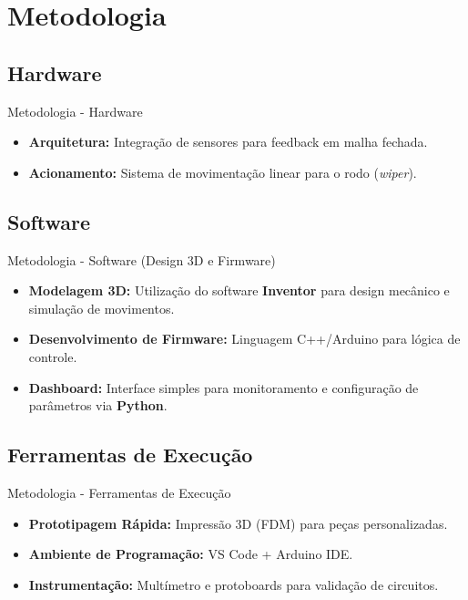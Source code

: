 \documentclass[aspectratio=169, xcolor={table}]{beamer}
\begin{document}
\section{Metodologia}
\subsection{Hardware}
\begin{frame}{Metodologia - Hardware}
    \begin{itemize}
        \item \textbf{Arquitetura:} Integração de sensores para feedback em malha fechada.
        \item \textbf{Acionamento:} Sistema de movimentação linear para o rodo (\textit{wiper}).
    \end{itemize}
\end{frame}

\subsection{Software}
\begin{frame}{Metodologia - Software (Design 3D e Firmware)}
    \begin{itemize}
        \item \textbf{Modelagem 3D:} Utilização do software \textbf{Inventor} para design mecânico e simulação de movimentos.
        \item \textbf{Desenvolvimento de Firmware:} Linguagem C++/Arduino para lógica de controle.
        \item \textbf{Dashboard:} Interface simples para monitoramento e configuração de parâmetros via \textbf{Python}.
    \end{itemize}
\end{frame}

\subsection{Ferramentas de Execução}
\begin{frame}{Metodologia - Ferramentas de Execução}
    \begin{itemize}
        \item \textbf{Prototipagem Rápida:} Impressão 3D (FDM) para peças personalizadas.
        \item \textbf{Ambiente de Programação:} VS Code + Arduino IDE.
        \item \textbf{Instrumentação:} Multímetro e protoboards para validação de circuitos.
    \end{itemize}
\end{frame}
\end{document}

